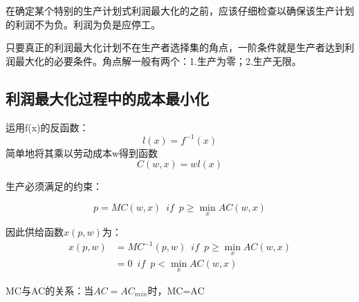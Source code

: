\documentclass{article}
\begin{document}
在确定某个特别的生产计划式利润最大化的之前，应该仔细检查以确保该生产计划的利润不为负。利润为负是应停工。

只要真正的利润最大化计划不在生产者选择集的角点，一阶条件就是生产者达到利润最大化的必要条件。角点解一般有两个：1.生产为零；2.生产无限。

\subsection{利润最大化过程中的成本最小化}

运用f(x)的反函数：
\[
l(x)=f^{-1}(x)
\]
简单地将其乘以劳动成本w得到函数
\[
C(w,x)=wl(x)
\]

生产必须满足的约束：

\[
p=MC(w,x)\enspace if\enspace p\ge \min_{x}{AC(w,x)}
\]

因此供给函数$ x(p,w) $为：
\begin{equation*}
	\begin{split}
	x(p,w)&=MC^{-1}(p,w)\enspace if\enspace p\ge \min_{x}{AC(w,x)}\\
	&=0\enspace if\enspace p<\min_{x}{AC(w,x)}
	\end{split}
\end{equation*}

MC与AC的关系：当$ AC=AC_{min} $时，MC=AC
\end{document}
